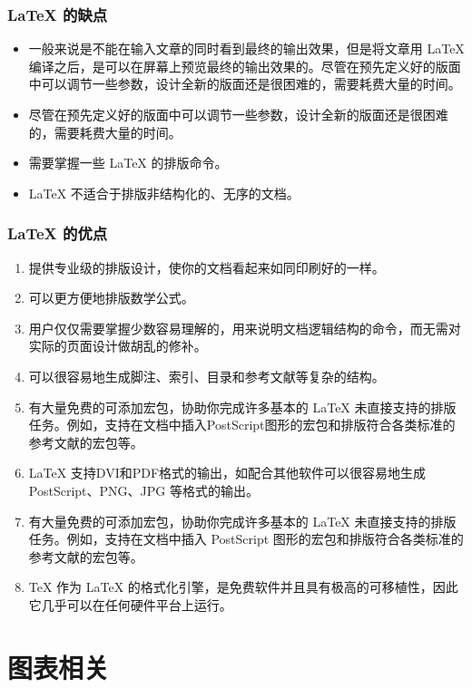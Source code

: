 \documentclass[report, twoside, UTF8, AutoFakeBold = 1, AutoFakeSlant, zihao = -4]{config}
\begin{document}
\subsection{\LaTeX{} 的缺点}

\begin{itemize}
    \item 一般来说是不能在输入文章的同时看到最终的输出效果，但是将文章用 \LaTeX{} 编译之后，是可以在屏幕上预览最终的输出效果的。尽管在预先定义好的版面中可以调节一些参数，设计全新的版面还是很困难的，需要耗费大量的时间。
    \item 尽管在预先定义好的版面中可以调节一些参数，设计全新的版面还是很困难的，需要耗费大量的时间。
    \item 需要掌握一些 \LaTeX{} 的排版命令。
    \item \LaTeX{} 不适合于排版非结构化的、无序的文档。
\end{itemize}

\subsection{\LaTeX{} 的优点}

\begin{enumerate}
    \item 提供专业级的排版设计，使你的文档看起来如同印刷好的一样。
    \item 可以更方便地排版数学公式。
    \item 用户仅仅需要掌握少数容易理解的，用来说明文档逻辑结构的命令，而无需对实际的页面设计做胡乱的修补。
    \item 可以很容易地生成脚注、索引、目录和参考文献等复杂的结构。
    \item 有大量免费的可添加宏包，协助你完成许多基本的 \LaTeX{} 未直接支持的排版任务。例如，支持在文档中插入PostScript图形的宏包和排版符合各类标准的参考文献的宏包等。
    \item \LaTeX{} 支持DVI和PDF格式的输出，如配合其他软件可以很容易地生成 PostScript、PNG、JPG 等格式的输出。
    \item 有大量免费的可添加宏包，协助你完成许多基本的 \LaTeX{} 未直接支持的排版任务。例如，支持在文档中插入 PostScript 图形的宏包和排版符合各类标准的参考文献的宏包等。
    \item \TeX{} 作为 \LaTeX{} 的格式化引擎，是免费软件并且具有极高的可移植性，因此它几乎可以在任何硬件平台上运行。
\end{enumerate}

\chapter{图表相关}
\end{document}
